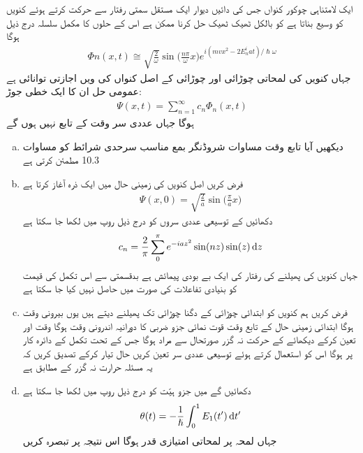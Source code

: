 ایک لامتناہی چوکور کنواں جس کی دائیں دیوار ایک مستقل سمتی رفتار  سے حرکت کرتے ہوئے کنویں کو وسیع بناتا ہے کو بالکل ٹھیک ٹھیک حل کرنا ممکن ہے اس کے حلوں کا مکمل سلسلہ درج ذیل ہوگا 
\begin{align}
\Phi n (x, t) \cong \sqrt{\frac{2}{\omega}} \sin \big ( \frac{n \pi}{\omega} x \big ) e^{i(mvx^2 -2E_n^i at)/\hslash \omega}
\end{align}
جہاں  کنویں کی لمحاتی چوڑائی اور چوڑائی  کے اصل کنواں کی  ویں اجازتی توانائی  ہے عمومی حل ان  کا ایک خطی جوڑ:
\begin{align}
\Psi (x, t) = \sum_{n = 1}^{\infty} c_n \Phi_n (x, t)
\end{align}
ہوگا جہاں عددی سر  وقت  کے تابع نہیں ہوں گے 
\begin{enumerate}[a.]
\item
دیکھیں آیا تابع وقت مساوات شروڈنگر بمع مناسب سرحدی شرائط کو مساوات 10.3  مطمئن کرتی ہے 
\item
فرض کریں اصل کنویں کی زمینی حال میں ایک ذرہ آغاز   کرتا ہے  
\begin{align*}
\Psi (x, 0) = \sqrt{\frac{2}{a}} \sin \big ( \frac{\pi}{a} x \big )
\end{align*}
دکھائیں کے  توسیعی  عددى سروں کو درج ذیل روپ میں لکھا جا سکتا ہے 
\begin{align}
c_n = \frac{2}{\pi} \sum_0^{\pi} e^{-iaz^2} \sin(nz) \sin(z) \dif z
\end{align}
جہاں 
کنویں کی پھیلنے کی رفتار کی ایک بے بودی پیمائش ہے بدقسمتی سے اس تکمل کی قیمت کو بنیادی تفاعلات کی صورت میں حاصل نہیں کیا جا سکتا ہے 
\item
فرض کریں ہم کنویں کو ابتدائی چوڑائی کے دگنا چوڑائی تک پھیلنے دیتے ہیں یوں بیرونی وقت  ہوگا ابتدائی زمینی حال کے تابع وقت قوت نمائی جزو ضربی کا دورانیہ اندرونی وقت ہوگا وقت  اور  تعین کرکے دیکھائے کے حرکت نہ گزر  صورتحال سے مراد  ہوگا جس کے تحت تکمل کے دائرہ کار پر  ہوگا اس کو استعمال کرتے ہوئے  توسیعی  عددی سر  تعین کریں حال  تیار کرکے تصدیق کریں کہ یہ مسئلہ حرارت نہ گزر کے مطابق ہے 
\item
دکھائیں گے  میں جزو ہيّت کو درج ذیل روپ میں لکھا جا سکتا ہے 
\begin{align}
\theta (t) = - \frac{1}{\hslash} \int_0^1 E_1 (t') \dif t'
\end{align}
جہاں لمحہ  پر لمحاتی امتیازی قدر  ہوگا اس نتیجہ پر تبصرہ کریں 
\end{enumerate}
